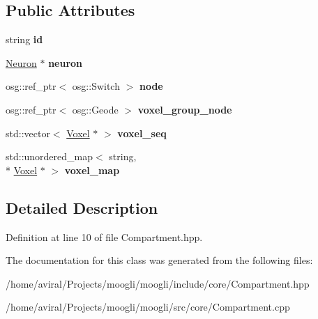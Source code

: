 \subsection*{Public Attributes}
\begin{DoxyCompactItemize}
\item 
\hypertarget{classCompartment_a1d3734cf005a65aeacf0872794db4f97}{string {\bfseries id}}\label{classCompartment_a1d3734cf005a65aeacf0872794db4f97}

\item 
\hypertarget{classCompartment_ac6f7e8ff3bd7bfc36cb4e1795d5e8cec}{\hyperlink{classNeuron}{Neuron} $\ast$ {\bfseries neuron}}\label{classCompartment_ac6f7e8ff3bd7bfc36cb4e1795d5e8cec}

\item 
\hypertarget{classCompartment_a81f71696a8a6336d5b0637585e26afd4}{osg\-::ref\-\_\-ptr$<$ osg\-::\-Switch $>$ {\bfseries node}}\label{classCompartment_a81f71696a8a6336d5b0637585e26afd4}

\item 
\hypertarget{classCompartment_a0a6f592f00bc11a5a4ad4f0c01e3b59d}{osg\-::ref\-\_\-ptr$<$ osg\-::\-Geode $>$ {\bfseries voxel\-\_\-group\-\_\-node}}\label{classCompartment_a0a6f592f00bc11a5a4ad4f0c01e3b59d}

\item 
\hypertarget{classCompartment_a3c0b324e4b052c57499f4f74e8994177}{std\-::vector$<$ \hyperlink{classVoxel}{Voxel} $\ast$ $>$ {\bfseries voxel\-\_\-seq}}\label{classCompartment_a3c0b324e4b052c57499f4f74e8994177}

\item 
\hypertarget{classCompartment_a53bdb07a6645e022c76cd6f3635e30b1}{std\-::unordered\-\_\-map$<$ string, \\*
\hyperlink{classVoxel}{Voxel} $\ast$ $>$ {\bfseries voxel\-\_\-map}}\label{classCompartment_a53bdb07a6645e022c76cd6f3635e30b1}

\end{DoxyCompactItemize}


\subsection{Detailed Description}


Definition at line 10 of file Compartment.\-hpp.



The documentation for this class was generated from the following files\-:\begin{DoxyCompactItemize}
\item 
/home/aviral/\-Projects/moogli/moogli/include/core/Compartment.\-hpp\item 
/home/aviral/\-Projects/moogli/moogli/src/core/Compartment.\-cpp\end{DoxyCompactItemize}
